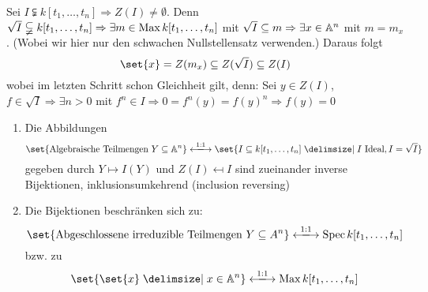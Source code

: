 \documentclass[12pt,a4paper]{scrartcl}
\theoremstyle{cplain}
\theoremstyle{cdef}
\begin{document}
\begin{bem}
	Sei $I\subsetneqq k[t_1,\dots, t_n]\Rightarrow Z(I)\neq \emptyset$. Denn $\sqrt{I}\subsetneqq k[t_1,\dots, t_n]\Rightarrow \exists m\in\operatorname{Max} k[t_1,\dots, t_n]$ mit $\sqrt{I} \subseteq m \Rightarrow \exists x\in\mathbb A^n$ mit $m = m_x$. (Wobei wir hier nur den schwachen Nullstellensatz verwenden.) Daraus folgt
	$$\set{x} = Z(m_x) \subseteq Z(\sqrt{I}) \subseteq Z(I)$$
	wobei im letzten Schritt schon Gleichheit gilt, denn: Sei $y\in Z(I)$, $f\in\sqrt {I}\Rightarrow \exists n>0$ mit $f^n\in I\Rightarrow 0 = f^n(y) = f(y)^n \Rightarrow f(y) = 0$
\end{bem}
\begin{kor}
	\leavevmode
	\begin{enumerate}
		\item Die Abbildungen
		$$\set{\text{Algebraische Teilmengen }Y\subseteq \IA^n}\xlongleftrightarrow{1:1}\set{I\subseteq k[t_1,\dots, t_n]\given I\text{ Ideal}, I = \sqrt{I}}$$
		gegeben durch $Y\mapsto I(Y)$ und $Z(I) \mapsfrom I$ sind zueinander inverse Bijektionen, inklusionsumkehrend (\glqq inclusion reversing\grqq)
		\item Die Bijektionen beschränken sich zu:
		$$ \set{\text{Abgeschlossene irreduzible Teilmengen }Y\subseteq A^n}  \xlongleftrightarrow{1:1}\Spec k[t_1,\dots, t_n]$$
		bzw. zu 
		$$\set{\set{x}\given x\in\IA^n}\xlongleftrightarrow{1:1}\Max k[t_1,\dots, t_n]$$
	\end{enumerate}
	
\end{kor}
\end{document}
